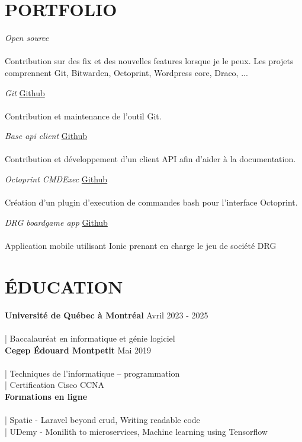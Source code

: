 \documentclass[margin, 10pt]{res} %
\begin{document}
\begin{resume}
\section{PORTFOLIO}

{\sl Open source} \hfill \\\\
Contribution sur des fix et des nouvelles features lorsque je le peux. Les projets comprennent Git, Bitwarden, Octoprint, Wordpress core, Draco, ...

{\sl Git} \hfill \hfill \href{https://github.com/git/git}{Github}\\\\
Contribution et maintenance de l'outil Git.

{\sl Base api client} \hfill \href{https://github.com/camphi/base-api-client}{Github}\\\\
Contribution et développement d'un client API afin d'aider à la documentation.

{\sl Octoprint CMDExec} \hfill \href{https://github.com/alexis-coulombe/Octoprint-CmdExec}{Github} \\\\
Création d'un plugin d'execution de commandes bash pour l'interface Octoprint.

{\sl DRG boardgame app} \hfill \href{https://github.com/alexis-coulombe/drg-boardgame-app}{Github} \\\\
Application mobile utilisant Ionic prenant en charge le jeu de société DRG

\section{ÉDUCATION}

{\textbf{Université de Québec à Montréal}} \hfill Avril 2023 - 2025 \\\\
| Baccalauréat en informatique et génie logiciel \\

{\textbf{Cegep Édouard Montpetit}} \hfill Mai 2019 \\\\
| Techniques de l’informatique – programmation \\
| Certification Cisco CCNA \\

{\textbf{Formations en ligne}} \hfill  \\\\
| Spatie - Laravel beyond crud, Writing readable code \\
| UDemy - Monilith to microservices, Machine learning using Tensorflow \\



\end{resume}
\end{document}
